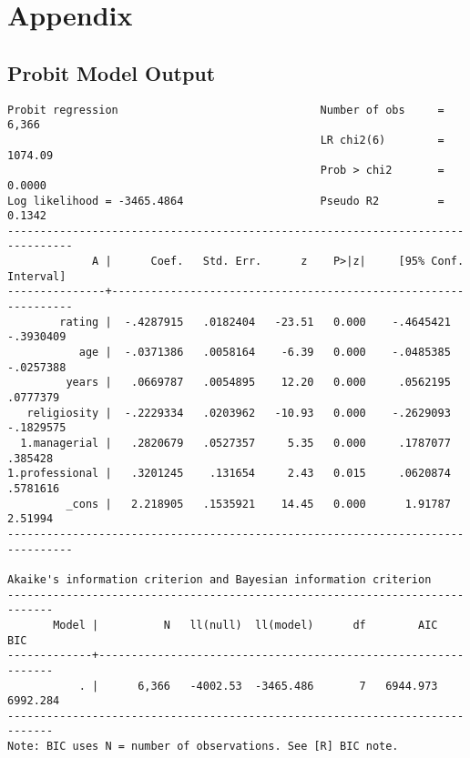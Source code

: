 \documentclass{article}
\begin{document}
\newpage

\section{Appendix}


\hypertarget{probitoutput}{\subsection*{Probit Model Output}}
\begin{verbatim}
Probit regression                               Number of obs     =      6,366
                                                LR chi2(6)        =    1074.09
                                                Prob > chi2       =     0.0000
Log likelihood = -3465.4864                     Pseudo R2         =     0.1342
--------------------------------------------------------------------------------
             A |      Coef.   Std. Err.      z    P>|z|     [95% Conf. Interval]
---------------+----------------------------------------------------------------
        rating |  -.4287915   .0182404   -23.51   0.000    -.4645421   -.3930409
           age |  -.0371386   .0058164    -6.39   0.000    -.0485385   -.0257388
         years |   .0669787   .0054895    12.20   0.000     .0562195    .0777379
   religiosity |  -.2229334   .0203962   -10.93   0.000    -.2629093   -.1829575
  1.managerial |   .2820679   .0527357     5.35   0.000     .1787077     .385428
1.professional |   .3201245    .131654     2.43   0.015     .0620874    .5781616
         _cons |   2.218905   .1535921    14.45   0.000      1.91787     2.51994
--------------------------------------------------------------------------------

Akaike's information criterion and Bayesian information criterion
-----------------------------------------------------------------------------
       Model |          N   ll(null)  ll(model)      df        AIC        BIC
-------------+---------------------------------------------------------------
           . |      6,366   -4002.53  -3465.486       7   6944.973   6992.284
-----------------------------------------------------------------------------
Note: BIC uses N = number of observations. See [R] BIC note.
\end{verbatim}
\end{document}
